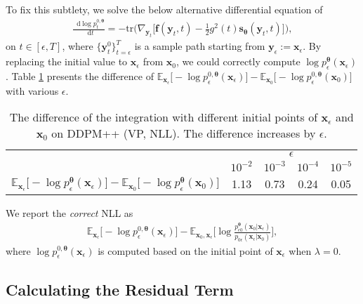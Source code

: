 \documentclass{article}
\theoremstyle{definition}
\theoremstyle{remark}
\newcommand*\diff{\mathop{}\!\mathrm{d}}
\begin{document}
	To fix this subtlety, we solve the below alternative differential equation of
	\begin{align}\label{eq:modified_ode}
	\frac{\diff \log{p_{t}^{0,\bm{\theta}}}}{\diff t}=-\text{tr}\bigg(\nabla_{\mathbf{y}_{t}}\Big[\mathbf{f}(\mathbf{y}_{t},t)-\frac{1}{2}g^{2}(t)\mathbf{s}_{\bm{\theta}}(\mathbf{y}_{t},t)\Big]\bigg),
	\end{align}
	on $t\in[\epsilon,T]$, where $\{\mathbf{y}_{t}^{0}\}_{t=\epsilon}^{T}$ is a sample path starting from $\mathbf{y}_{\epsilon}:=\mathbf{x}_{\epsilon}$. By replacing the initial value to $\mathbf{x}_{\epsilon}$ from $\mathbf{x}_{0}$, we could correctly compute $\log{p_{\epsilon}^{\bm{\theta}}(\mathbf{x}_{\epsilon})}$. Table \ref{tab:difference} presents the difference of $\mathbb{E}_{\mathbf{x}_{\epsilon}}\big[-\log{p_{\epsilon}^{0,\bm{\theta}}(\mathbf{x}_{\epsilon})}\big]-\mathbb{E}_{\mathbf{x}_{0}}\big[-\log{p_{\epsilon}^{0,\bm{\theta}}(\mathbf{x}_{0})}\big]$ with various $\epsilon$.
	\begin{table}[t]
		\caption{The difference of the integration with different initial points of $\mathbf{x}_{\epsilon}$ and $\mathbf{x}_{0}$ on DDPM++ (VP, NLL). The difference increases by $\epsilon$.}
		\label{tab:difference}
		\centering
		\tiny
		\begin{tabular}{ccccc}
			\toprule
			& \multicolumn{4}{c}{$\epsilon$}\\\cmidrule(lr){2-5}
			& $10^{-2}$ & $10^{-3}$ & $10^{-4}$ & $10^{-5}$\\\midrule
			$\mathbb{E}_{\mathbf{x}_{\epsilon}}\big[-\log{p_{\epsilon}^{\bm{\theta}}(\mathbf{x}_{\epsilon})}\big]-\mathbb{E}_{\mathbf{x}_{0}}\big[-\log{p_{\epsilon}^{\bm{\theta}}(\mathbf{x}_{0})}\big]$ & 1.13 & 0.73 & 0.24 & 0.05 \\
			\bottomrule
		\end{tabular}
	\end{table}
	We report the \textit{correct} NLL as
	\begin{align*}
	\mathbb{E}_{\mathbf{x}_{\epsilon}}\big[-\log{p_{\epsilon}^{0,\bm{\theta}}(\mathbf{x}_{\epsilon})}\big]-\mathbb{E}_{\mathbf{x}_{0},\mathbf{x}_{\epsilon}}\bigg[\log{\frac{p_{\epsilon 0}^{\bm{\theta}}(\mathbf{x}_{0}\vert\mathbf{x}_{\epsilon})}{p_{0\epsilon}(\mathbf{x}_{\epsilon}\vert\mathbf{x}_{0})}}\bigg],
	\end{align*}
	where $\log{p_{\epsilon}^{0,\bm{\theta}}(\mathbf{x}_{\epsilon})}$ is computed based on the initial point of $\mathbf{x}_{\epsilon}$ when $\lambda=0$.
	
	\subsection{Calculating the Residual Term}
	
\end{document}
